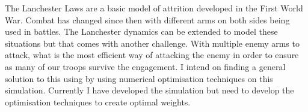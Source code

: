 The Lanchester Laws are a basic model of attrition developed in the First World War. Combat has changed since then with different arms on both sides being used in battles. The Lanchester dynamics can be extended to model these situations but that comes with another challenge. With multiple enemy arms to attack, what is the most efficient way of attacking the enemy in order to ensure as many of our troops survive the engagement. I intend on finding a general solution to this using by using numerical optimisation techniques on this simulation. Currently I have developed the simulation but need to develop the optimisation techniques to create optimal weights. 